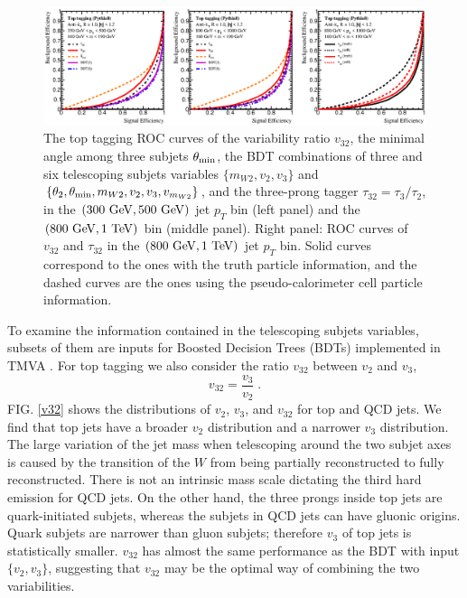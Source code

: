 \documentclass[aps,prl,floatfix,preprintnumbers,twocolumn,groupedaddress,nofootinbib]{revtex4-1}
\newcommand{\be}{\begin{equation}}
\newcommand{\ee}{\end{equation}}
\begin{document}
\begin{figure}
    \includegraphics[width=2\columnwidth]{plots/Top_ROCs_1.eps}
    \caption{The top tagging ROC curves of the variability ratio $v_{32}$, the minimal angle among three subjets $\theta_{\rm min}$, the BDT combinations of three and six telescoping subjets variables $\{m_{W2},v_2,v_3\}$ and $\{\theta_2,\theta_{\rm min},m_{W2},v_2,v_3,v_{m_{W2}}\}$, and the three-prong tagger $\tau_{32}=\tau_{3}/\tau_{2}$, in the $(300~{\rm GeV}, 500~{\rm GeV})$ jet $p_T$ bin (left panel) and the $(800~{\rm GeV}, 1~{\rm TeV})$ bin (middle panel). Right panel: ROC curves of $v_{32}$ and $\tau_{32}$ in the $(800~{\rm GeV}, 1~{\rm TeV})$ jet $p_T$ bin. Solid curves correspond to the ones with the truth particle information, and the dashed curves are the ones using the pseudo-calorimeter cell particle information.}
\label{ROC_top}
\end{figure}

To examine the information contained in the telescoping subjets variables, subsets of them are inputs for Boosted Decision Trees (BDTs) implemented in \textsc{TMVA} \cite{Hocker:2007ht}. %
For top tagging we also consider the ratio $v_{32}$ between $v_2$ and $v_3$,
\be
    v_{32}=\frac{v_3}{v_2}\;.
\ee
FIG. \ref{v32} shows the distributions of $v_2$, $v_3$, and $v_{32}$ for top and QCD jets. We find that top jets have a broader $v_2$ distribution and a narrower $v_3$ distribution. The large variation of the jet mass when telescoping around the two subjet axes is caused by the transition of the $W$ from being partially reconstructed to fully reconstructed. There is not an intrinsic mass scale dictating the third hard emission for QCD jets. On the other hand, the three prongs inside top jets are quark-initiated subjets, whereas the subjets in QCD jets can have gluonic origins. Quark subjets are narrower than gluon subjets; therefore $v_3$ of top jets is statistically smaller. $v_{32}$ has almost the same performance as the BDT with input $\{v_2,v_3\}$, suggesting that $v_{32}$ may be the optimal way of combining the two variabilities.
\end{document}
